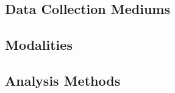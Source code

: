 \documentclass[manuscript,screen,review]{acmart}
\begin{document}
\subsection{Data Collection Mediums} 


\subsection{Modalities} \label{sec:Modalities}


\subsection{Analysis Methods}
\end{document}
